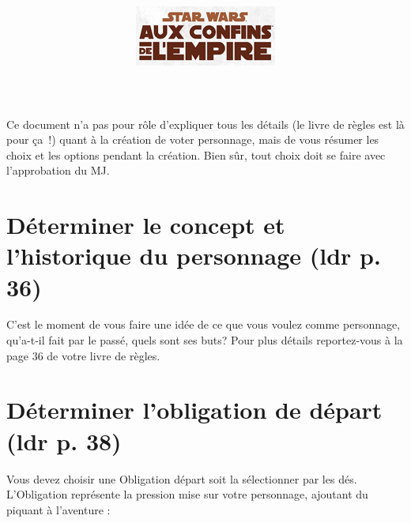 \documentclass[twoside]{article}
\begin{document}
\title{\vspace{8cm}{\Huge Star Wars aux confins de l'empire} \\ \vspace{2cm} \includegraphics{../_img/logo}}

\date{}



\maketitle
\vspace{4cm}
Ce document n’a pas pour rôle d'expliquer tous les détails (le livre de règles est là pour ça !) quant à la création de voter personnage, mais de vous résumer les choix et les options pendant la création. Bien sûr, tout choix doit se faire avec l’approbation du MJ.
\clearpage
\tableofcontents
\clearpage

\section{Déterminer le concept et l'historique du personnage (ldr p. 36)}

C'est le moment de vous faire une idée de ce que vous voulez comme personnage, qu'a-t-il fait par le passé, quels sont ses buts? Pour plus détails reportez-vous à la page 36 de votre livre de règles.

\section{Déterminer l'obligation de départ (ldr p. 38)}
Vous devez choisir une Obligation départ soit la sélectionner par les dés. L'Obligation représente la pression mise sur votre personnage, ajoutant du piquant à l'aventure :
\end{document}

